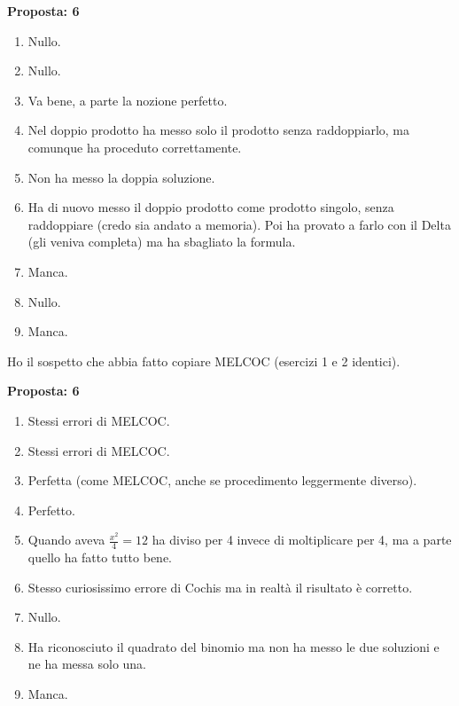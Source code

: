 \documentclass[11pt]{report}
\begin{document}
\begin{description}
    \textbf{Proposta: 6}
    \begin{enumerate}
        \item Nullo.
        \item Nullo.
        \item Va bene, a parte la nozione perfetto.
        \item Nel doppio prodotto ha messo solo il prodotto senza raddoppiarlo, ma comunque ha proceduto correttamente.
        \item Non ha messo la doppia soluzione.
        \item Ha di nuovo messo il doppio prodotto come prodotto singolo, senza raddoppiare (credo sia andato a memoria). Poi ha provato a farlo con il Delta (gli veniva completa) ma ha sbagliato la formula.
        \item Manca.
        \item Nullo.
        \item Manca.
    \end{enumerate} 
    \item[CLAMAR] Ho il sospetto che abbia fatto copiare MELCOC (esercizi 1 e 2 identici).
    
    \textbf{Proposta: 6}
    \begin{enumerate}
        \item Stessi errori di MELCOC.
        \item Stessi errori di MELCOC.
        \item Perfetta (come MELCOC, anche se procedimento leggermente diverso).
        \item Perfetto.
        \item Quando aveva $\frac{x^2}4=12$ ha diviso per 4 invece di moltiplicare per 4, ma a parte quello ha fatto tutto bene.
        \item Stesso curiosissimo errore di Cochis ma in realtà il risultato è corretto.
        \item Nullo.
        \item Ha riconosciuto il quadrato del binomio ma non ha messo le due soluzioni e ne ha messa solo una.
        \item Manca.
    \end{enumerate}
\end{description}
\end{document}
